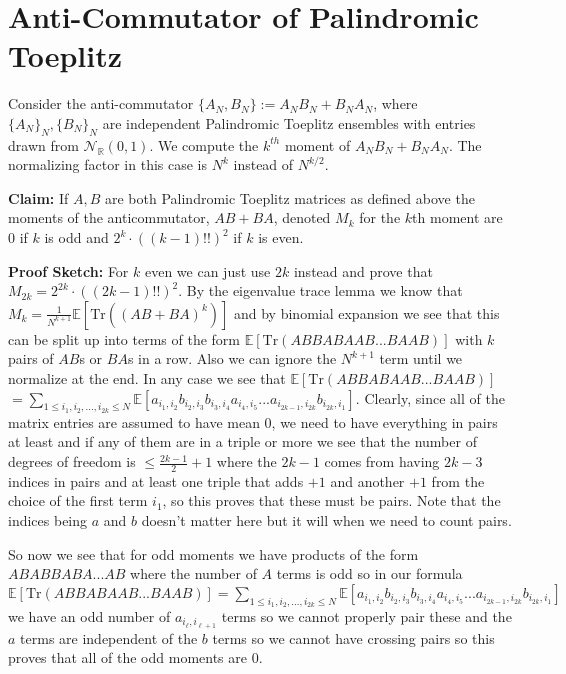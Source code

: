 \documentclass[12pt,reqno]{amsart}
\theoremstyle{plain} %
\theoremstyle{remark}
\theoremstyle{definition}
\newcommand{\R}{\mathbb R}
\begin{document}
\section{Anti-Commutator of Palindromic Toeplitz}
Consider the anti-commutator $\{A_N,B_N\}:=A_NB_N+B_NA_N$, where $\{A_N\}_{N}, \{B_N\}_{N}$ are independent Palindromic Toeplitz ensembles with entries drawn from $\mathcal{N}_\R(0,1)$. We compute the $k^{th}$ moment of $A_NB_N+B_NA_N$. The normalizing factor in this case is $N^k$ instead of $N^{k/2}$.

\textbf{Claim:} If $A,B$ are both Palindromic Toeplitz matrices as defined above the moments of the anticommutator, $AB+BA$, denoted $M_k$ for the $k$th moment are $0$ if $k$ is odd and $2^k\cdot ((k-1)!!)^2$ if $k$ is even.

\textbf{Proof Sketch:} For $k$ even we can just use $2k$ instead and prove that $M_{2k}=2^{2k}\cdot ((2k-1)!!)^2$. By the eigenvalue trace lemma we know that $M_k=\frac{1}{N^{k+1}}\mathbb{E}[\text{Tr}((AB+BA)^k)]$ and by binomial expansion we see that this can be split up into terms of the form $\mathbb{E}[\text{Tr}(ABBABAAB...BAAB)]$ with $k$ pairs of $AB$s or $BA$s in a row. Also we can ignore the $N^{k+1}$ term until we normalize at the end. In any case we see that $\mathbb{E}[\text{Tr}(ABBABAAB...BAAB)] $ \newline  $=\sum_{1\leq i_1,i_2,...,i_{2k}\leq N}\mathbb{E}[a_{i_1,i_2}b_{i_2,i_3}b_{i_3,i_4}a_{i_4,i_5}...a_{i_{2k-1},i_{2k}}b_{i_{2k},i_1}]$. Clearly, since all of the matrix entries are assumed to have mean $0$, we need to have everything in pairs at least and if any of them are in a triple or more we see that the number of degrees of freedom is $\leq \frac{2k-1}{2}+1$ where the $2k-1$ comes from having $2k-3$ indices in pairs and at least one triple that adds $+1$ and another $+1$ from the choice of the first term $i_1$, so this proves that these must be pairs. Note that the indices being $a$ and $b$ doesn't matter here but it will when we need to count pairs.

So now we see that for odd moments we have products of the form $ABABBABA...AB$ where the number of $A$ terms is odd so in our formula $\mathbb{E}[\text{Tr}(ABBABAAB...BAAB)]=\sum_{1\leq i_1,i_2,...,i_{2k}\leq N}\mathbb{E}[a_{i_1,i_2}b_{i_2,i_3}b_{i_3,i_4}a_{i_4,i_5}...a_{i_{2k-1},i_{2k}}b_{i_{2k},i_1}]$ we have an odd number of $a_{i_\ell,i_{\ell+1}}$ terms so we cannot properly pair these and the $a$ terms are independent of the $b$ terms so we cannot have crossing pairs so this proves that all of the odd moments are $0$.
\end{document}
